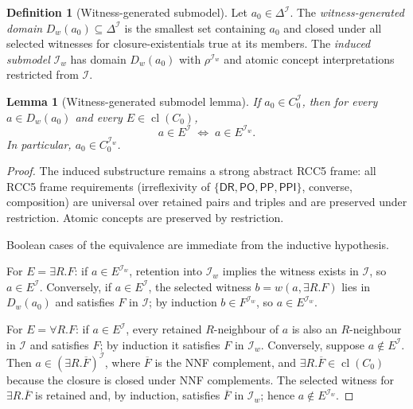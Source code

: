 \documentclass[11pt]{article}
\newtheorem{lemma}[theorem]{Lemma}
\theoremstyle{definition}
\newtheorem{definition}[theorem]{Definition}
\theoremstyle{remark}
\newcommand{\DR}{\mathsf{DR}}
\newcommand{\PO}{\mathsf{PO}}
\newcommand{\PP}{\mathsf{PP}}
\newcommand{\PPI}{\mathsf{PPI}}
\newcommand{\BaseEdge}{\{\DR,\PO,\PP,\PPI\}}
\newcommand{\cl}{\operatorname{cl}}
\begin{document}
\begin{definition}[Witness-generated submodel]
\label{def:witness-generated}
Let $a_0 \in \Delta^{\mathcal{I}}$.  The \emph{witness-generated
domain} $D_w(a_0) \subseteq \Delta^{\mathcal{I}}$ is the smallest
set containing $a_0$ and closed under all selected witnesses for
closure-existentials true at its members.  The \emph{induced
submodel} $\mathcal{I}_w$ has domain $D_w(a_0)$ with
$\rho^{\mathcal{I}_w}$ and atomic concept interpretations restricted
from $\mathcal{I}$.
\end{definition}

\begin{lemma}[Witness-generated submodel
lemma]\label{lem:witness-generated}
If $a_0 \in C_0^{\mathcal{I}}$, then for every $a \in D_w(a_0)$ and
every $E \in \cl(C_0)$,
\[
a \in E^{\mathcal{I}} \;\Longleftrightarrow\; a \in E^{\mathcal{I}_w}.
\]
In particular, $a_0 \in C_0^{\mathcal{I}_w}$.
\end{lemma}

\begin{proof}
The induced substructure remains a strong abstract RCC5 frame: all
RCC5 frame requirements (irreflexivity of $\BaseEdge$, converse,
composition) are universal over retained pairs and triples and are
preserved under restriction.  Atomic concepts are preserved by
restriction.

Boolean cases of the equivalence are immediate from the inductive
hypothesis.

For $E = \exists R.F$: if $a \in E^{\mathcal{I}_w}$, retention into
$\mathcal{I}_w$ implies the witness exists in $\mathcal{I}$, so
$a \in E^{\mathcal{I}}$.  Conversely, if $a \in E^{\mathcal{I}}$,
the selected witness $b = w(a,\exists R.F)$ lies in $D_w(a_0)$ and
satisfies $F$ in $\mathcal{I}$; by induction $b \in
F^{\mathcal{I}_w}$, so $a \in E^{\mathcal{I}_w}$.

For $E = \forall R.F$: if $a \in E^{\mathcal{I}}$, every retained
$R$-neighbour of $a$ is also an $R$-neighbour in $\mathcal{I}$ and
satisfies $F$; by induction it satisfies $F$ in $\mathcal{I}_w$.
Conversely, suppose $a \notin E^{\mathcal{I}}$.  Then $a \in
(\exists R.\overline{F})^{\mathcal{I}}$, where $\overline{F}$ is
the NNF complement, and $\exists R.\overline{F} \in \cl(C_0)$
because the closure is closed under NNF complements.  The selected
witness for $\exists R.\overline{F}$ is retained and, by induction,
satisfies $\overline{F}$ in $\mathcal{I}_w$; hence $a \notin
E^{\mathcal{I}_w}$.
\end{proof}
\end{document}
